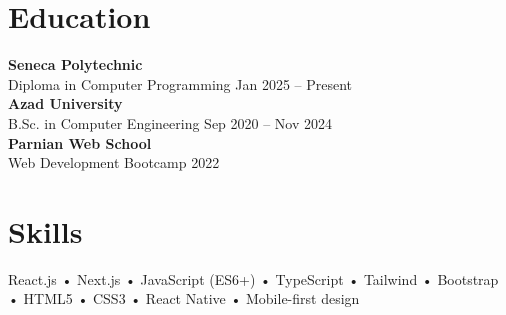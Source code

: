 \documentclass[letterpaper,11pt]{article}
\begin{document}
\vspace{0.6em}

\section*{Education}
\textbf{Seneca Polytechnic}\\
Diploma in Computer Programming \hfill Jan 2025 -- Present\\

\textbf{Azad University}\\
B.Sc. in Computer Engineering \hfill Sep 2020 -- Nov 2024\\

\textbf{Parnian Web School}\\
Web Development Bootcamp \hfill 2022

\vspace{0.6em}

\section*{Skills}
React.js • Next.js • JavaScript (ES6+) • TypeScript • Tailwind • Bootstrap • HTML5 • CSS3 • React Native • Mobile-first design
\end{document}
